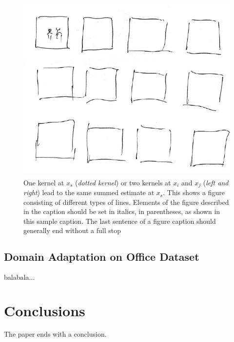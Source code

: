 \documentclass[runningheads]{llncs}
\begin{document}
\begin{figure}
\centering
\includegraphics[height=9.5cm]{images/resultimages.png}
\caption{One kernel at $x_s$ ({\it dotted kernel}) or two kernels at
$x_i$ and $x_j$ ({\it left and right}) lead to the same summed estimate
at $x_s$. This shows a figure consisting of different types of
lines. Elements of the figure described in the caption should be set in
italics,
in parentheses, as shown in this sample caption. The last
sentence of a figure caption should generally end without a full stop}
\label{fig:example}
\end{figure}

\subsection{Domain Adaptation on Office Dataset}
balabala...

\section{Conclusions}

The paper ends with a conclusion.




\end{document}
